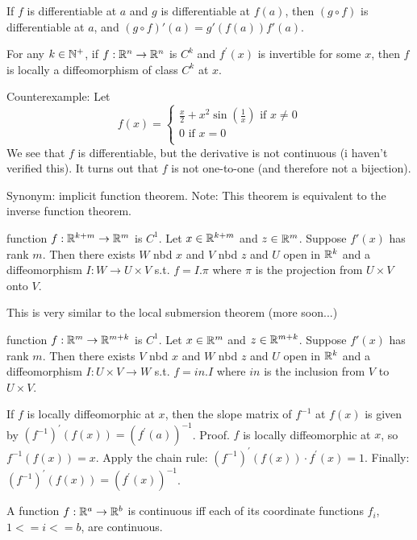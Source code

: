 \documentclass[11pt,leqno,oneside]{amsart}
\begin{document}
\begin{thm}
	If $f$ is differentiable at $a$ and $g$ is differentiable at $f(a)$, then $(g \circ f)$ is differentiable at $a$, and $(g \circ f)'(a) = g'(f(a))f'(a)$.
\end{thm}
\begin{thm}
	For any $k \in {\mathbb N}^+$, if $f:{\mathbb R}^n \to {\mathbb R}^n$ is $C^k$ and $f^\prime(x)$ is invertible for some $x$, then $f$ is locally a diffeomorphism of class $C^k$ at $x$.
\end{thm}
\begin{example}
	Counterexample: Let $$f(x) =
	\begin{cases}
		\frac x2 + x^2\sin\left(\frac 1x\right) \text{ if $x \neq 0$} \\
		0 \text{ if $x=0$} \\
	\end{cases}
	$$  We see that $f$ is differentiable, but the derivative is not continuous (i haven't verified this).  It turns out that $f$ is not one-to-one (and therefore not a bijection).
\end{example}
\begin{thm}
	Synonym: implicit function theorem.
	Note: This theorem is equivalent to the inverse function theorem.

	function $f : {\mathbb R}^{k+m} \to {\mathbb R}^m$ is $C^1$.
	Let $x \in {\mathbb R}^{k+m}$ and $z \in {\mathbb R}^m$.
	Suppose $f'(x)$ has rank $m$.
	Then there exists $W$ nbd $x$ and $V$ nbd $z$ and $U$ open in ${\mathbb R}^k$ and a diffeomorphism $I : W \to U \times V$
	s.t. $f = I.\pi$ where $\pi$ is the projection from $U \times V$ onto $V$.

\end{thm}
\begin{thm}
	This is very similar to the local submersion theorem (more soon...)

	function $f : {\mathbb R}^{m} \to {\mathbb R}^{m+k}$ is $C^1$.
	Let $x \in {\mathbb R}^{m}$ and $z \in {\mathbb R}^{m+k}$.
	Suppose $f'(x)$ has rank $m$.
	Then there exists $V$ nbd $x$ and $W$ nbd $z$ and $U$ open in ${\mathbb R}^k$ and a diffeomorphism $I : U \times V \to W$
	s.t. $f = in.I$ where $in$ is the inclusion from $V$ to $U \times V$.

\end{thm}
\begin{thm}
	If $f$ is locally diffeomorphic at $x$, then the slope matrix of $f^{-1}$ at $f(x)$ is given by $(f^{-1})^\prime(f(x)) = (f^\prime(a))^{-1}$.
	Proof. $f$ is locally diffeomorphic at $x$, so $f^{-1}(f(x)) = x$.
	Apply the chain rule: $(f^{-1})^\prime(f(x)) \cdot f^\prime(x) = 1$.
	Finally: $(f^{-1})^\prime(f(x)) = (f^\prime(x))^{-1}$.
\end{thm}
\begin{thm}
	A function $f : {\mathbb R}^a \to {\mathbb R}^b$ is continuous iff each of its coordinate functions $f_i$, $1<= i <=b$, are continuous.
\end{thm}
\end{document}
